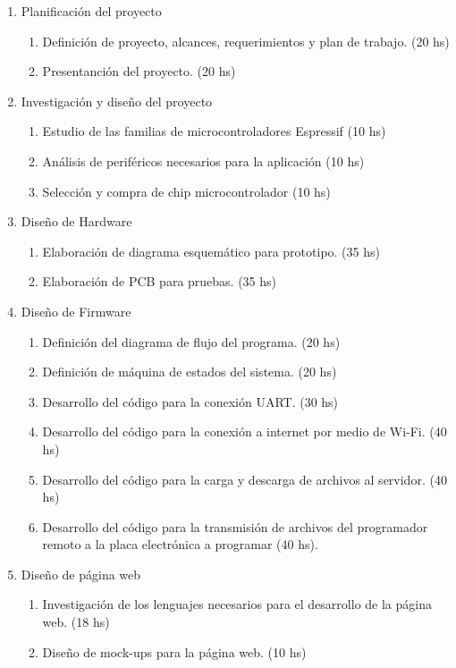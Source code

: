 \documentclass[
11pt, %
]{charter}
\begin{document}
\begin{enumerate}
\item Planificación del proyecto
	\begin{enumerate}
	\item Definición de proyecto, alcances, requerimientos y plan de trabajo. (20 hs)
	\item Presentanción del proyecto. (20 hs)
	\end{enumerate}
\item Investigación y diseño del proyecto
	\begin{enumerate}
	\item Estudio de las familias de microcontroladores Espressif (10 hs)
	\item Análisis de periféricos necesarios para la aplicación (10 hs)
	\item Selección y compra de chip microcontrolador (10 hs)
	\end{enumerate}
\item Diseño de Hardware
	\begin{enumerate}
	\item Elaboración de diagrama esquemático para prototipo. (35 hs)
	\item Elaboración de PCB para pruebas. (35 hs)
	\end{enumerate}
\item Diseño de Firmware
	\begin{enumerate}
	\item Definición del diagrama de flujo del programa. (20 hs)
	\item Definición de máquina de estados del sistema. (20 hs)
	\item Desarrollo del código para la conexión UART. (30 hs)
	\item Desarrollo del código para la conexión a internet por medio de Wi-Fi. (40 hs)
	\item Desarrollo del código para la carga y descarga de archivos al servidor. (40 hs)
	\item Desarrollo del código para la transmisión de archivos del programador remoto a la placa electrónica a programar (40 hs).
	\end{enumerate}
\item Diseño de página web
	\begin{enumerate}
	\item Investigación de los lenguajes necesarios para el desarrollo de la página web. (18 hs)
	\item Diseño de mock-ups para la página web. (10 hs)

\end{enumerate}
\end{enumerate}
\end{document}
